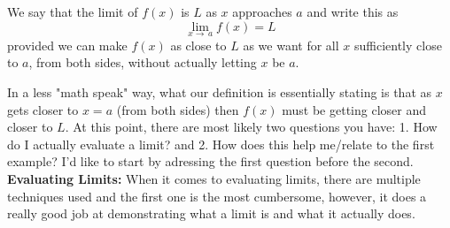 \documentclass[addpoints]{exam}
\begin{document}
  \begin{tcolorbox}[breakable, title=DEFINITION OF THE LIMIT, colframe=black, sharp corners, colback=white, colbacktitle=white, coltitle=black]
    We say that the limit of $f(x)$ is $L$ as $x$ approaches $a$ and write this as 
    \[\lim\limits_{x\to\,a} f(x)=L\] 
    provided we can make $f(x)$ as close to $L$ as we want for all $x$ sufficiently close to $a$, from both sides, without actually letting $x$ be $a$.
  \end{tcolorbox}
  \vspace{0.1in}
  \noindent In a less "math speak" way, what our definition is essentially stating is that as $x$ gets closer to $x=a$ (from both sides) then $f(x)$ must be getting closer and closer to $L$. At this point, there are most likely two questions you have: 1. How do I actually evaluate a limit? and 2. How does this help me/relate to the first example? I'd like to start by adressing the first question before the second. \\
  \makebox[\linewidth]{\hrulefill}
  \newline\large\textbf{Evaluating Limits:}
  \newline\normalsize When it comes to evaluating limits, there are multiple techniques used and the first one is the most cumbersome, however, it does a really good job at demonstrating what a limit is and what it actually does.
\end{document}
